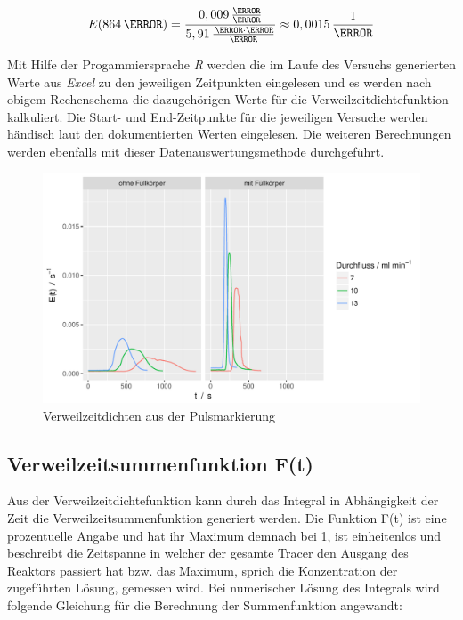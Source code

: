 \documentclass[12pt,liststotoc]{report}
\begin{document}
\begin{equation*}
E(864\,\s) = \frac{0,009\,\frac{\mole}{\litre}}{5,91\,\frac{\,\mole\cdot\s}{\litre}} \approx0,0015\,\frac{1}{\s}
\end{equation*}

Mit Hilfe der Progammiersprache \textit{R} werden die im Laufe des Versuchs generierten Werte aus \textit{Excel} zu den jeweiligen Zeitpunkten eingelesen und es werden nach obigem Rechenschema die dazugehörigen Werte für die Verweilzeitdichtefunktion kalkuliert. Die Start- und End-Zeitpunkte für die jeweiligen Versuche werden händisch laut den dokumentierten Werten eingelesen. Die weiteren Berechnungen  werden ebenfalls mit dieser Datenauswertungsmethode durchgeführt.

\begin{figure}[H]
\centering
\includegraphics[width=1\textwidth]{Graphics/E_stoss.pdf}
\caption[Verweilzeitdichte Pulsmarkierungen]{Verweilzeitdichten aus der Pulsmarkierung}
\label{dichte_stoss}
\end{figure}
\noindent





\subsection{Verweilzeitsummenfunktion F(t)}

Aus der Verweilzeitdichtefunktion kann durch das Integral in Abhängigkeit der Zeit die Verweilzeitsummenfunktion generiert werden. Die Funktion F(t) ist eine prozentuelle Angabe und hat ihr Maximum demnach bei 1, ist einheitenlos und beschreibt die Zeitspanne in welcher der gesamte Tracer den Ausgang des Reaktors passiert hat bzw. das Maximum, sprich die Konzentration der zugeführten Lösung, gemessen wird. Bei numerischer Lösung des Integrals wird folgende Gleichung für die Berechnung der Summenfunktion angewandt:
\end{document}
